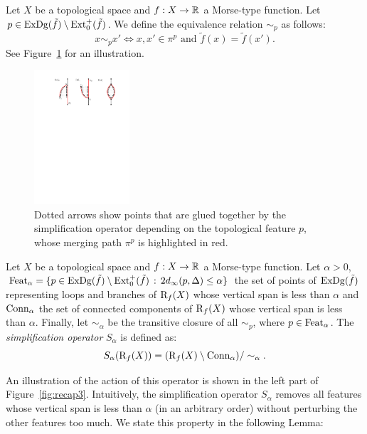 \begin{defin}
Let $X$ be a topological space and $f:X\rightarrow\mathbb{R}$ a Morse-type function.
Let $p\in\mathrm{ExDg}(\tilde f)\setminus\mathrm{Ext}_0^+(\tilde f)$. We define the equivalence relation $\sim_p$ as follows:
$$
x\sim_p x' \Leftrightarrow x,x'\in\pi^p\text{ and }\tilde f(x)=\tilde f(x'). %
$$
See Figure~\ref{fig:simplificationop} for an illustration.
\end{defin}

\begin{figure}\centering
\includegraphics[height=5cm]{figures/ExampleSimplificationOp}
\caption[Feature simplification]{\label{fig:simplificationop} Dotted arrows show points that are glued together by the simplification operator depending
on the topological feature $p$, whose merging path $\pi^p$ is highlighted in red. }
\end{figure}

\begin{defin}
Let $X$ be a topological space and $f:X\rightarrow\mathbb{R}$ a Morse-type function.
Let $\alpha >0$, ${\rm Feat}_\alpha=\{p\in\mathrm{ExDg}(\tilde f)\setminus \mathrm{Ext}_0^+(\tilde f)\,:\,2d_\infty(p,\Delta)\leq \alpha\}$
the set of points of $\mathrm{ExDg}(\tilde f)$ representing loops and branches of $\mathrm{R}_f(X)$ whose vertical span is less than $\alpha$
and ${\rm Conn}_\alpha$ the set of connected components of $\mathrm{R}_f(X)$ whose vertical span is less than $\alpha$.
Finally, let $\sim_\alpha$ be the transitive closure of all $\sim_p$, where $p\in {\rm Feat}_\alpha$.
The {\em simplification operator} $S_\alpha$ is defined as:
$$S_\alpha(\mathrm{R}_f(X))=(\mathrm{R}_f(X)\setminus {\rm Conn}_\alpha)/\sim_\alpha.$$
\end{defin}

An illustration of the action of this operator is shown in the left part of Figure~\ref{fig:recap3}.
Intuitively, the simplification operator $S_\alpha$ removes all features  whose vertical span is less than $\alpha$
(in an arbitrary order) without perturbing the other features too much. We state this property in the following Lemma:

